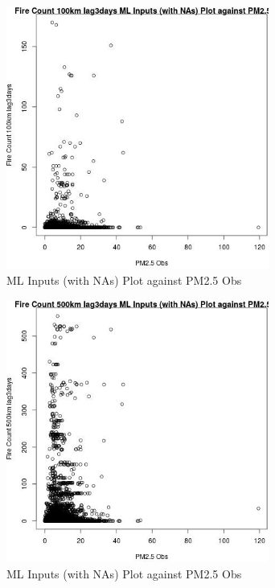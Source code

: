 \begin{figure} 
\centering  
\includegraphics[width=0.77\textwidth]{Code_Outputs/Report_ML_input_PM25_Step4_part_e_de_duplicated_aves_compiled_2019-05-18wNAs_Fire_Count_100km_lag3daysvPM25_Obs.jpg} 
\caption{\label{fig:Report_ML_input_PM25_Step4_part_e_de_duplicated_aves_compiled_2019-05-18wNAsFire_Count_100km_lag3daysvPM25_Obs}ML Inputs (with NAs) Plot against PM2.5 Obs} 
\end{figure} 
 

\begin{figure} 
\centering  
\includegraphics[width=0.77\textwidth]{Code_Outputs/Report_ML_input_PM25_Step4_part_e_de_duplicated_aves_compiled_2019-05-18wNAs_Fire_Count_500km_lag3daysvPM25_Obs.jpg} 
\caption{\label{fig:Report_ML_input_PM25_Step4_part_e_de_duplicated_aves_compiled_2019-05-18wNAsFire_Count_500km_lag3daysvPM25_Obs}ML Inputs (with NAs) Plot against PM2.5 Obs} 
\end{figure} 
 

